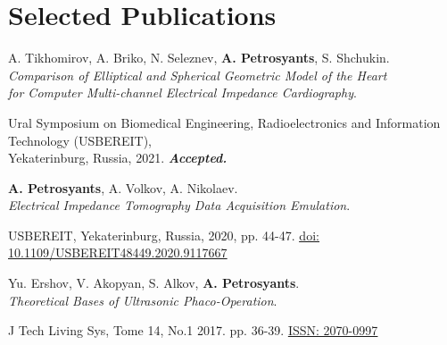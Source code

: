 \section{Selected Publications}
\resumeSubHeadingListStart
\resumeProjectHeading
  {A. Tikhomirov, A. Briko, N. Seleznev, \textbf{A. Petrosyants}, S. Shchukin.\\
  \textit{Comparison of Elliptical and Spherical Geometric
  Model of the Heart}\\
  \textit{for Computer Multi-channel Electrical Impedance Cardiography}.}{}
      \begin{itemize}[leftmargin=0in, label={}]
        \small{\item{
          {Ural Symposium on Biomedical Engineering, Radioelectronics and Information Technology (USBEREIT), \\ 
          Yekaterinburg, Russia, 2021.}
          {\textbf{\textit{Accepted.}}}
        }}
      \end{itemize}

\resumeProjectHeading
    {\textbf{A. Petrosyants}, A. Volkov, A. Nikolaev.\\
  \textit{Electrical Impedance Tomography Data Acquisition Emulation}.}{}
      \begin{itemize}[leftmargin=0in, label={}]
      \small{\item{
        {USBEREIT, Yekaterinburg, Russia, 2020, pp. 44-47.}
        {\href{https://ieeexplore.ieee.org/abstract/document/9117667/}{\underline{doi: 10.1109/USBEREIT48449.2020.9117667}}}
      }}
      \end{itemize}

  \resumeProjectHeading
      {Yu. Ershov, V. Akopyan, S. Alkov, \textbf{A. Petrosyants}.\\
    \textit{Theoretical Bases of Ultrasonic Phaco-Operation}.}{}
        \begin{itemize}[leftmargin=0in, label={}]
        \small{\item{ 
          {J Tech Living Sys, Tome 14, No.1 2017. pp. 36-39. \href{https://www.elibrary.ru/item.asp?id=29715174}{\underline{ISSN: 2070-0997}}}
            }}
      \end{itemize}
\resumeSubHeadingListEnd